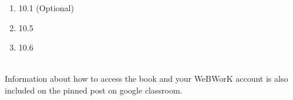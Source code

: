 \documentclass[12pt]{article}
\begin{document}
\begin{enumerate}
  \setlength{\itemsep}{-1mm}
\item 10.1 (Optional) 
\item 10.5
\item 10.6
\end{enumerate}

\\

\noindent Information about how to access the book and your WeBWorK
account is also included on the pinned post on google classroom. 
\end{document}
